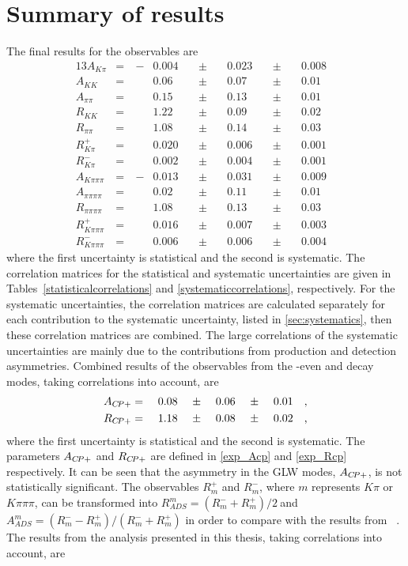 \section{Summary of results}
\label{sec:cpfit:summary}

The final results for the \CP observables are  
\begin{alignat*}{13}
A_{K\pi} &= &\ -&0.004&\ &\pm&\ &0.023&\ &\pm&\ &0.008& \\
A_{KK} &= &&0.06&\ &\pm&\ &0.07&\ &\pm&\ &0.01& \\
A_{\pi\pi} &= &&0.15&\ &\pm&\ &0.13&\ &\pm&\ &0.01& \\
R_{KK} &= &&1.22&\ &\pm&\ &0.09&\ &\pm&\ &0.02& \\
R_{\pi\pi} &= &&1.08&\ &\pm&\ &0.14&\ &\pm&\ &0.03& \\
R^+_{K\pi} &= &&0.020&\ &\pm&\ &0.006&\ &\pm&\ &0.001& \\ 
R^-_{K\pi} &= &&0.002&\ &\pm&\ &0.004&\ &\pm&\ &0.001& \\
A_{K\pi\pi\pi} &= &\ -&0.013&\ &\pm&\ &0.031&\ &\pm&\ &0.009& \\
A_{\pi\pi\pi\pi} &= &&0.02&\ &\pm&\ &0.11&\ &\pm&\ &0.01& \\
R_{\pi\pi\pi\pi} &= &&1.08&\ &\pm&\ &0.13&\ &\pm&\ &0.03& \\
R^+_{K\pi\pi\pi} &= &&0.016&\ &\pm&\ &0.007&\ &\pm&\ &0.003& \\ 
R^-_{K\pi\pi\pi} &= &&0.006&\ &\pm&\ &0.006&\ &\pm&\ &0.004&
\end{alignat*}
where the first uncertainty is statistical and the second is systematic. The correlation matrices for the statistical and systematic uncertainties are given in Tables~\ref{statisticalcorrelations} and \ref{systematiccorrelations}, respectively. For the systematic uncertainties, the correlation matrices are calculated separately for each contribution to the systematic uncertainty, listed in \sect\ref{sec:systematics}, then these correlation matrices are combined. The large correlations of the systematic uncertainties are mainly due to the contributions from production and detection asymmetries. Combined results of the \CP observables from the \CP-even \kk and \pipi decay modes, taking correlations into account, are
\begin{alignat*}{13}
A_{\CP+} &= &\ &0.08&\ &\pm&\ &0.06&\ &\pm&\ &0.01& \text{,}\\
R_{\CP+} &= &\ &1.18&\ &\pm&\ &0.08&\ &\pm&\ &0.02& \text{,}
\end{alignat*}
where the first uncertainty is statistical and the second is systematic. The parameters $A_{{C\!P}+}$ and $R_{{C\!P}+}$ are defined in \eqns\ref{exp_Acp} and \ref{exp_Rcp} respectively. It can be seen that the asymmetry in the GLW modes, $A_{{C\!P}+}$, is not statistically significant. The \CP observables $R^+_m$ and $R^-_m$, where $m$ represents $K\pi$ or $K\pi\pi\pi$, can be transformed into $R_{ADS}^m = \left(R^-_m + R^+_m\right)/2\ $and \mbox{$A_{ADS}^m = \left(R^-_m - R^+_m\right)/\left(R^-_m + R^+_m\right)$} in order to compare with the results from \babar~\cite{BaBarDKstar}. The results from the analysis presented in this thesis, taking correlations into account, are
